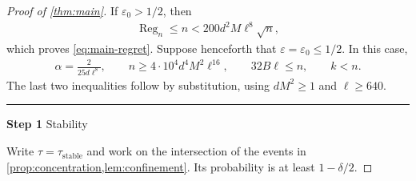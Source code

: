 \documentclass{article}
\newcommand{\proofstep}[2]{%
    \par\medskip
    \noindent
    \textcolor{blue!55!black}{\rule{2pt}{1.2em}}%
    \hspace{0.6em}%
    {\sffamily\bfseries\color{blue!55!black}Step #1}%
    \quad
    {\sffamily #2}%
    \par\smallskip
}
\newcommand{\1}{\mathbf 1}
\newcommand{\eps}{\varepsilon}
\begin{document}
\begin{proof}[Proof of \cref{thm:main}]
    If $\eps_0>1/2$, then
    \begin{align}
        \operatorname{Reg}_n\leq n
        <200d^2M\ell^8\sqrt n,
    \end{align}
    which proves \eqref{eq:main-regret}. Suppose henceforth that
    $\eps=\eps_0\leq1/2$. In this case,
    \begin{align}
        \alpha=\frac{2}{25d\ell^8},
        \qquad
        n\geq4\cdot10^4d^4M^2\ell^{16},
        \qquad
        32B\ell\leq n,
        \qquad k<n.
        \label{eq:active-horizon}
    \end{align}
    The last two inequalities follow by substitution, using
    $dM^2\geq1$ and $\ell\geq640$.

    \proofstep{1}{Stability}
    Write $\tau=\tau_{\mathrm{stable}}$ and work on the intersection of the
    events in \cref{prop:concentration,lem:confinement}. Its probability
    is at least $1-\delta/2$.


\end{proof}
\end{document}
